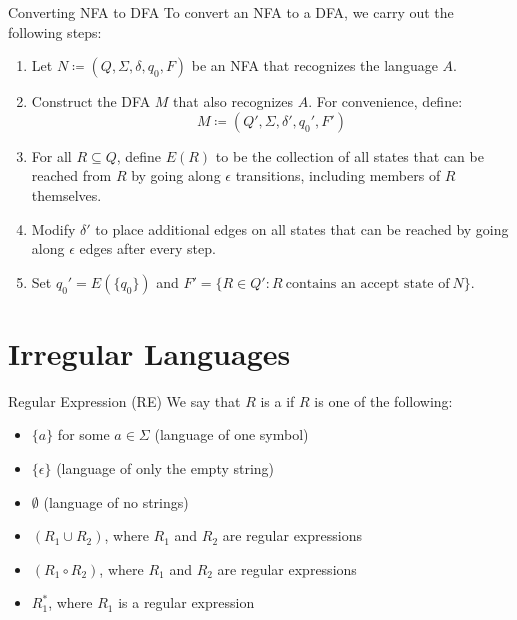 \documentclass[math]{amznotes}
\begin{document}
\begin{tecbox}{Converting NFA to DFA}{}
    To convert an NFA to a DFA, we carry out the following steps:
    \begin{enumerate}
        \item Let $N \coloneq (Q, \Sigma, \delta, q_0, F)$ be an NFA that recognizes the language $A$.
        \item Construct the DFA $M$ that also recognizes $A$. For convenience, define:
        \[ M \coloneq (Q\prime, \Sigma, \delta\prime, q_0\prime, F\prime) \]
        \item For all $R \subseteq Q$, define $E(R)$ to be the collection of all states that can be reached from $R$ by going along $\epsilon$ transitions, including members of $R$ themselves.
        \item Modify $\delta\prime$ to place additional edges on all states that can be reached by going along $\epsilon$ edges after every step.
        \item Set $q_0\prime = E(\{q_0\})$ and $F\prime = \{ R \in Q\prime : R\ \text{contains an accept state of}\ N \}$.
    \end{enumerate}
\end{tecbox}



\chapter{Irregular Languages}
\begin{dfnbox}{Regular Expression (RE)}{}
    We say that $R$ is a  if $R$ is one of the following:
    \begin{itemize}[noitemsep]
        \item $\{a\}$ for some $a \in \Sigma$ (language of one symbol)
        \item $\{\epsilon\}$ (language of only the empty string)
        \item $\emptyset$ (language of no strings)
        \item $(R_1 \cup R_2)$, where $R_1$ and $R_2$ are regular expressions
        \item $(R_1 \circ R_2)$, where $R_1$ and $R_2$ are regular expressions
        \item $R_1^*$, where $R_1$ is a regular expression
    \end{itemize}
\end{dfnbox}
\end{document}
